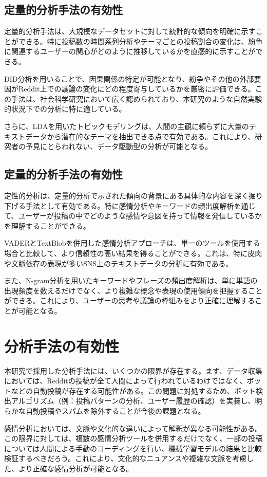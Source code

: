 \documentclass[11pt, a4j]{jreport}
\begin{document}
    \subsection{定量的分析手法の有効性}
    定量的分析手法は、大規模なデータセットに対して統計的な傾向を明確に示すことができる。特に投稿数の時間系列分析やテーマごとの投稿割合の変化は、紛争に関連するユーザーの関心がどのように推移しているかを直感的に示すことができる。

    DID分析を用いることで、因果関係の特定が可能となり、紛争やその他の外部要因がReddit上での議論の変化にどの程度寄与しているかを厳密に評価できる。この手法は、社会科学研究において広く認められており、本研究のような自然実験的状況下での分析に特に適している。

    さらに、LDAを用いたトピックモデリングは、人間の主観に頼らずに大量のテキストデータから潜在的なテーマを抽出できる点で有効である。これにより、研究者の予見にとらわれない、データ駆動型の分析が可能となる。

    \subsection{定量的分析手法の有効性}
    定性的分析は、定量的分析で示された傾向の背景にある具体的な内容を深く掘り下げる手法として有効である。特に感情分析やキーワードの頻出度解析を通じて、ユーザーが投稿の中でどのような感情や意図を持って情報を発信しているかを理解することができる。

    VADERとTextBlobを併用した感情分析アプローチは、単一のツールを使用する場合と比較して、より信頼性の高い結果を得ることができる。これは、特に皮肉や文脈依存の表現が多いSNS上のテキストデータの分析に有効である。

    また、N-gram分析を用いたキーワードやフレーズの頻出度解析は、単に単語の出現頻度を数えるだけでなく、より複雑な概念や表現の使用傾向を把握することができる。これにより、ユーザーの思考や議論の枠組みをより正確に理解することが可能となる。

    \section{分析手法の有効性}
    本研究で採用した分析手法には、いくつかの限界が存在する。まず、データ収集においては、Redditの投稿が全て人間によって行われているわけではなく、ボットなどの自動投稿が存在する可能性がある。この問題に対処するため、ボット検出アルゴリズム（例：投稿パターンの分析、ユーザー履歴の確認）を実装し、明らかな自動投稿やスパムを除外することが今後の課題となる。

    感情分析においては、文脈や文化的な違いによって解釈が異なる可能性がある。この限界に対しては、複数の感情分析ツールを併用するだけでなく、一部の投稿については人間による手動のコーディングを行い、機械学習モデルの結果と比較検証するべきだろう。これにより、文化的なニュアンスや複雑な文脈を考慮した、より正確な感情分析が可能となる。
\end{document}
